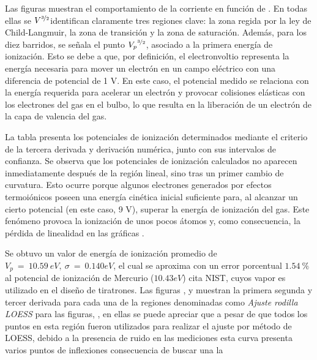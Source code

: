 Las figuras \ut{\ref{fig:pot1} - \ref{fig:pot10}} muestran el comportamiento de la corriente en función de . En todas ellas se $V^{\nicefrac{3}{2}}$identifican claramente tres regiones clave: la zona regida por la ley de Child-Langmuir, la zona de transición y la zona de saturación. Además, para los diez barridos, se señala el punto ${V_{p}}^{\nicefrac{3}{2}}$, asociado a la primera energía de ionización. Esto se debe a que, por definición, el electronvoltio representa la energía necesaria para mover un electrón en un campo eléctrico con una diferencia de potencial de 1 V. En este caso, el potencial medido se relaciona con la energía requerida para acelerar un electrón y provocar colisiones elásticas con los electrones del gas en el bulbo, lo que resulta en la liberación de un electrón de la capa de valencia del gas.

La tabla \ut{\ref{tab:pots}} presenta los potenciales de ionización determinados mediante el criterio de la tercera derivada y derivación numérica, junto con sus intervalos de confianza. Se observa que los potenciales de ionización calculados no aparecen inmediatamente después de la región lineal, sino tras un primer cambio de curvatura. Esto ocurre porque algunos electrones generados por efectos termoiónicos poseen una energía cinética inicial suficiente para, al alcanzar un cierto potencial (en este caso, 9 V), superar la energía de ionización del gas. Este fenómeno provoca la ionización de unos pocos átomos y, como consecuencia, la pérdida de linealidad en las gráficas \ut{\ref{fig:pot1} - \ref{fig:pot10}}.


Se obtuvo un valor de energía de ionización promedio de $V_{p}\ =\ 	10.59\ eV,\ \sigma\ =\ 0.140 eV$, el cual se aproxima con un error porcentual $1.54\ \%$ al potencial de ionización de Mercurio ($10.43eV$) {\color{Mulberry} cita NIST}, cuyos vapor es utilizado en el diseño de tiratrones. Las figuras \ut{\ref{fig:derspot1} - \ref{fig:derspot10}}, y \ut{\ref{fig:der3pot1} - \ref{fig:der3pot10}}  muestran la primera segunda y tercer derivada para cada una de la regiones denominadas como \textit{Ajuste rodilla LOESS} para las figuras, \ut{\ref{fig:pot1} - \ref{fig:pot10}}, en ellas se puede apreciar que a pesar de que todos los puntos en esta región fueron utilizados para realizar el ajuste por método de LOESS, debido a la presencia de ruido en las mediciones esta curva presenta varios puntos de inflexiones consecuencia de buscar una  la 
